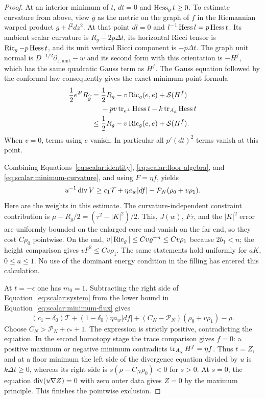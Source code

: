 \begin{proof}
At an interior minimum of $t$, $dt=0$ and $\operatorname{Hess}_g t\geq0$.
To estimate curvature from above, view $\bar g$ as the metric on the
graph of $f$ in the Riemannian warped product $g+l^2dz^2$.
At that point $dl=0$ and $l^{-1}\operatorname{Hess} l=p\operatorname{Hess} t$.  Its ambient
scalar curvature is $R_g-2p\Delta t$, its horizontal Ricci tensor
is $\operatorname{Ric}_g-p\operatorname{Hess} t$, and its unit vertical Ricci component is
$-p\Delta t$.  The graph unit normal is
$D^{-1/2}\partial_{z,\mathrm{unit}}-w$ and its second form with this
orientation is $-H^f$, which has the same quadratic Gauss term as $H^f$.
The Gauss equation followed by the conformal law consequently gives
the exact minimum-point formula
\begin{equation}
 \begin{aligned}
 \frac12e^{2t}R_{\widehat g}
 ={}&\frac12R_g-v\operatorname{Ric}_g(e,e)+\mathcal S(H^f)\\
   &-pv\operatorname{tr}_{e^\perp}\operatorname{Hess} t-k\operatorname{tr}_{A_d}\operatorname{Hess} t\\
 \leq{}&\frac12R_g-v\operatorname{Ric}_g(e,e)+\mathcal S(H^f).
 \end{aligned}
 \label{eq:scalar:minimum-curvature}
\end{equation}
When $v=0$, terms using $e$ vanish.  In particular all $p'(dt)^2$
terms vanish at this point.

Combining Equations~\eqref{eq:scalar:identity},
\eqref{eq:scalar:floor-algebra}, and
\eqref{eq:scalar:minimum-curvature}, and using $F=\eta f$, yields
\begin{equation}
 u^{-1}\operatorname{div} V\geq c_1\mathcal T+\eta a_w|df|
                              -\mathcal P_N(\rho_0+v\rho_1).
 \label{eq:scalar:minimum-flux}
\end{equation}
Here are the weights in this estimate.  The curvature-independent
constraint contribution is
$\mu-R_g/2=(\tau^2-|K|^2)/2$.  This, $J(w)$, $F\tau$, and the
$|K|^2$ error are uniformly bounded on the enlarged core and vanish
on the far end, so they cost $C\rho_0$ pointwise.  On the end,
$v|\operatorname{Ric}_g|\leq Cv\varrho^{-n}\leq Cv\rho_1$ because $2b_1<n$;
the height comparison gives $vF^2\leq Cv\rho_1$.  The same statements
hold uniformly for $aK$, $0\leq a\leq1$.  No use of the dominant
energy condition in the filling has entered this calculation.

At $t=-\epsilon$ one has $m_0=1$.  Subtracting the right side of
Equation~\eqref{eq:scalar:system} from the lower bound in
Equation~\eqref{eq:scalar:minimum-flux} gives
\[
 (c_1-\delta_0)\mathcal T+(1-\delta_0)\eta a_w|df|
        +(C_N-\mathcal P_N)(\rho_0+v\rho_1)-\rho.
\]
Choose $C_N>\mathcal P_N+c_*+1$.  The expression is strictly
positive, contradicting the equation.  In the second homotopy stage
the trace comparison gives $f=0$: a positive maximum or negative
minimum contradicts $\operatorname{tr}_{A_\chi}H^f=\eta f$.
Thus $t=Z$, and at a floor minimum the left side of the divergence
equation divided by $u$ is $k\Delta t\geq0$, whereas its right side
is $s(\rho-C_N\rho_0)<0$ for $s>0$.  At $s=0$, the equation
$\operatorname{div}(u\nabla Z)=0$ with zero outer data gives $Z=0$ by the maximum
principle.  This finishes the pointwise exclusion.
\end{proof}

